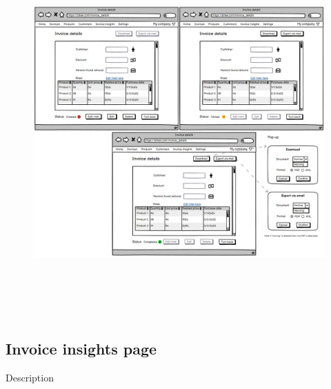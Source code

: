 \begin{figure}[h!]
    \centering
    \includegraphics[height=400pt, keepaspectratio]{resources/mockup/Invoice_details.png}
\end{figure}
\newpage
\subsection{Invoice insights page}

Description

